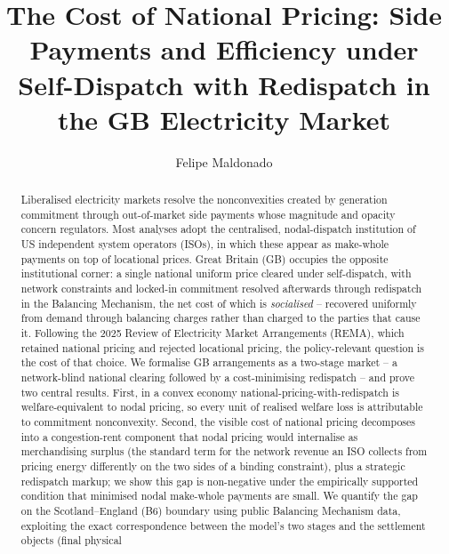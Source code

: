 \documentclass[review,3p,times]{elsarticle}
\theoremstyle{plain}
\theoremstyle{definition}
\begin{document}
\begin{frontmatter}

\title{The Cost of National Pricing: Side Payments and Efficiency under
Self-Dispatch with Redispatch in the GB Electricity Market}

\author[essex]{Felipe Maldonado}

\address[essex]{School of Mathematics, Statistics and Actuarial Science, University of Essex,
Colchester CO4 3SQ, United Kingdom}

\begin{abstract}
Liberalised electricity markets resolve the nonconvexities created by
generation commitment through out-of-market side payments whose magnitude and
opacity concern regulators. Most analyses adopt the centralised, nodal-dispatch
institution of US independent system operators (ISOs), in which these appear as make-whole
payments on top of locational prices. Great Britain (GB) occupies the opposite
institutional corner: a single national uniform price cleared under
self-dispatch, with network constraints and locked-in commitment resolved
afterwards through redispatch in the Balancing Mechanism, the net cost of which
is \emph{socialised} -- recovered uniformly from demand through balancing charges
rather than charged to the parties that cause it. Following the 2025 Review of Electricity Market
Arrangements (REMA), which retained national pricing and rejected locational
pricing, the policy-relevant question is the cost of that choice. We formalise
GB arrangements as a two-stage market -- a network-blind national clearing
followed by a cost-minimising redispatch -- and prove two central results. First, in a
convex economy national-pricing-with-redispatch is welfare-equivalent to nodal
pricing, so every unit of realised welfare loss is attributable to commitment
nonconvexity. Second, the visible cost of national pricing decomposes into a
congestion-rent component that nodal pricing would internalise as merchandising
surplus (the standard term for the network revenue an ISO collects from pricing
energy differently on the two sides of a binding constraint), plus a strategic
redispatch markup; we show this gap is non-negative
under the empirically supported condition that minimised nodal make-whole
payments are small. We quantify the gap on the Scotland--England (B6) boundary
using public Balancing Mechanism data, exploiting the exact correspondence
between the model's two stages and the settlement objects (final physical

\end{abstract}
\end{frontmatter}
\end{document}
